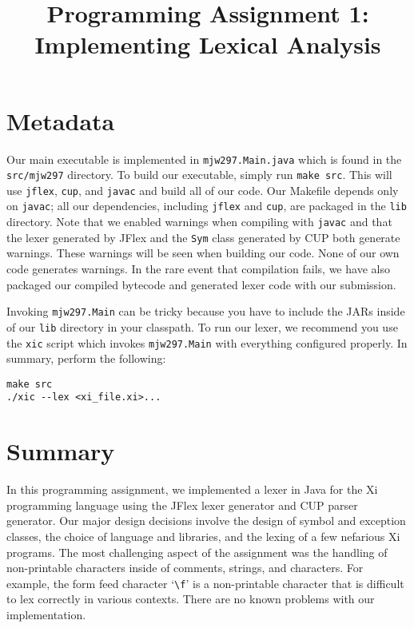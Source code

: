 \documentclass{hw}
\title{Programming Assignment 1:\\ Implementing Lexical Analysis}
\begin{document}
\maketitle

\section{Metadata}\label{sec:metadata}
Our main executable is implemented in \texttt{mjw297.Main.java} which is found
in the \texttt{src/mjw297} directory. To build our executable, simply run
\texttt{make src}. This will use \texttt{jflex}, \texttt{cup}, and
\texttt{javac} and build all of our code. Our Makefile depends only on
\texttt{javac}; all our dependencies, including \texttt{jflex} and
\texttt{cup}, are packaged in the \texttt{lib} directory.  Note that we enabled
warnings when compiling with \texttt{javac} and that the lexer generated by
JFlex and the \texttt{Sym} class generated by CUP both generate warnings. These
warnings will be seen when building our code.  None of our own code generates
warnings. In the rare event that compilation fails, we have also packaged our
compiled bytecode and generated lexer code with our submission.

Invoking \texttt{mjw297.Main} can be tricky because you have to include the
JARs inside of our \texttt{lib} directory in your classpath. To run our lexer,
we recommend you use the \texttt{xic} script which invokes \texttt{mjw297.Main}
with everything configured properly. In summary, perform the following:

\begin{center}
\begin{BVerbatim}
make src
./xic --lex <xi_file.xi>...
\end{BVerbatim}
\end{center}

\section{Summary}\label{sec:summary}
In this programming assignment, we implemented a lexer in Java for the Xi
programming language using the JFlex lexer generator and CUP parser generator.
Our major design decisions involve the design of symbol and exception classes,
the choice of language and libraries, and the lexing of a few nefarious Xi
programs. The most challenging aspect of the assignment was the handling of
non-printable characters inside of comments, strings, and characters. For
example, the form feed character `\verb$\f$' is a non-printable character that
is difficult to lex correctly in various contexts. There are no known problems
with our implementation.
\end{document}
